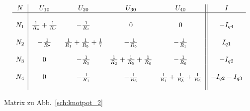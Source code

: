 \begin{table}[h!]
\footnotesize
\[ 	\begin{array}{c|cccc||c}
	N & U_{10}						& U_{20}										& U_{30} 											& U_{40} 											& I \\
	\hline &&&&& \\
	N_1	& \frac{1}{R_4} + \frac{1}{R_7}		& -\frac{1}{R_7} 								& 0 												& 0 												& -I_{q4} 			\\
	&&&&& \\
	N_2	& -\frac{1}{R_7} 					& \frac{1}{R_1} + \frac{1}{R_5} + \frac{1}{7} 	& -\frac{1}{R_5} 									& -\frac{1}{R_1} 									& I_{q1} 			\\ 
	&&&&& \\
	N_3	& 0 								& -\frac{1}{R_5} 								& \frac{1}{R_2} + \frac{1}{R_5} + \frac{1}{R_6} 	& -\frac{1}{R_6} 									& -I_{q2} 			\\ 
	&&&&& \\
	N_4 & 0 								& -\frac{1}{R_1} 								& -\frac{1}{R_6} 									& \frac{1}{R_1} + \frac{1}{R_3} + \frac{1}{R_6} 	& -I_{q2} -I_{q3} 	\\ 
	&&&&& \\
	\end{array}
\]
\normalsize
\caption{Matrix zu Abb.~\ref{sch:knotpot_2}}
\end{table}

\newpage
